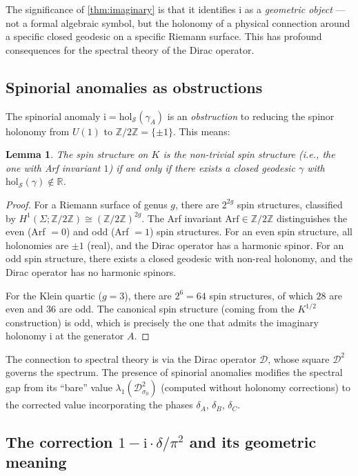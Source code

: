 \documentclass[12pt,a4paper]{article}
\newtheorem{lemma}[theorem]{Lemma}
\theoremstyle{definition}
\theoremstyle{remark}
\newcommand{\RR}{\mathbb{R}}
\newcommand{\ZZ}{\mathbb{Z}}
\newcommand{\hol}{\mathrm{hol}}
\newcommand{\cD}{\mathcal{D}}
\newcommand{\cS}{\mathcal{S}}
\newcommand{\ii}{\mathrm{i}}
\begin{document}
The significance of \cref{thm:imaginary} is that it identifies $\ii$ as a \emph{geometric object} --- not a formal algebraic symbol, but the holonomy of a physical connection around a specific closed geodesic on a specific Riemann surface. This has profound consequences for the spectral theory of the Dirac operator.

\subsection{Spinorial anomalies as obstructions}

The spinorial anomaly $\ii = \hol_{\cS}(\gamma_A)$ is an \emph{obstruction} to reducing the spinor holonomy from $U(1)$ to $\ZZ/2\ZZ = \{\pm 1\}$. This means:

\begin{lemma}
\label{lem:obstruction}
The spin structure on $K$ is the \emph{non-trivial} spin structure (i.e., the one with Arf invariant $1$) if and only if there exists a closed geodesic $\gamma$ with $\hol_{\cS}(\gamma) \notin \RR$.
\end{lemma}

\begin{proof}
For a Riemann surface of genus $g$, there are $2^{2g}$ spin structures, classified by $H^1(\Sigma; \ZZ/2\ZZ) \cong (\ZZ/2\ZZ)^{2g}$. The Arf invariant $\mathrm{Arf} \in \ZZ/2\ZZ$ distinguishes the even (Arf $= 0$) and odd (Arf $= 1$) spin structures. For an even spin structure, all holonomies are $\pm 1$ (real), and the Dirac operator has a harmonic spinor. For an odd spin structure, there exists a closed geodesic with non-real holonomy, and the Dirac operator has no harmonic spinors.

For the Klein quartic ($g = 3$), there are $2^6 = 64$ spin structures, of which $28$ are even and $36$ are odd. The canonical spin structure (coming from the $K^{1/2}$ construction) is odd, which is precisely the one that admits the imaginary holonomy $\ii$ at the generator $A$.
\end{proof}

The connection to spectral theory is via the Dirac operator $\cD$, whose square $\cD^2$ governs the spectrum. The presence of spinorial anomalies modifies the spectral gap from its ``bare'' value $\lambda_1(\cD^2_{\sigma_0})$ (computed without holonomy corrections) to the corrected value incorporating the phases $\delta_A$, $\delta_B$, $\delta_C$.

\subsection{The correction $1 - \ii \cdot \delta/\pi^2$ and its geometric meaning}
\end{document}
